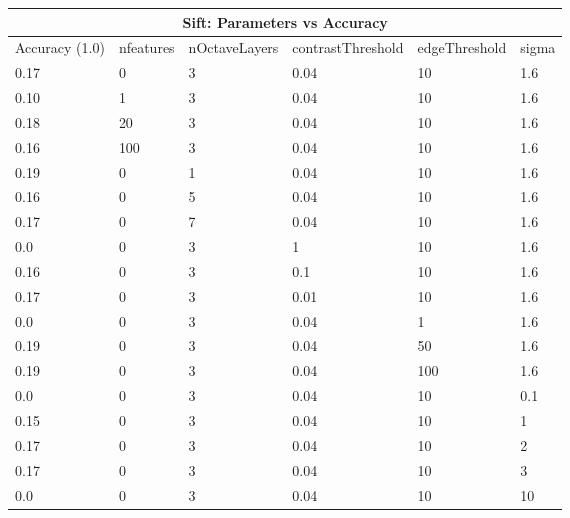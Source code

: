 \documentclass[12pt]{article}
\begin{document}
    \vspace*{0.5cm}
        \begin{tabular}{ |p{1.5cm}||p{3cm}|p{3cm}|p{3cm}|p{3cm}|p{2cm}|  }
            \hline
            \multicolumn{6}{|c|}{Sift: Parameters vs Accuracy} \\
            \hline
            Accuracy (1.0) & nfeatures & nOctaveLayers & contrastThreshold & edgeThreshold & sigma \\
            \hline
            0.17 & 0 & 3 & 0.04 & 10 & 1.6 \\
            \hline
            \hline
            0.10 & 1 & 3 & 0.04 & 10 & 1.6 \\
            0.18 & 20 & 3 & 0.04 & 10 & 1.6 \\
            0.16 & 100 & 3 & 0.04 & 10 & 1.6 \\
            \hline
            \hline
            0.19 & 0 & 1 & 0.04 & 10 & 1.6 \\
            0.16 & 0 & 5 & 0.04 & 10 & 1.6 \\
            0.17 & 0 & 7 & 0.04 & 10 & 1.6 \\
            \hline
            \hline
            0.0 & 0 & 3 & 1 & 10 & 1.6 \\
            0.16 & 0 & 3 & 0.1 & 10 & 1.6 \\
            0.17 & 0 & 3 & 0.01 & 10 & 1.6 \\
            \hline
            \hline
            0.0 & 0 & 3 & 0.04 & 1 & 1.6 \\
            0.19 & 0 & 3 & 0.04 & 50 & 1.6 \\
            0.19 & 0 & 3 & 0.04 & 100 & 1.6 \\
            \hline
            \hline
            0.0 & 0 & 3 & 0.04 & 10 & 0.1 \\
            0.15 & 0 & 3 & 0.04 & 10 & 1 \\
            0.17 & 0 & 3 & 0.04 & 10 & 2 \\
            0.17 & 0 & 3 & 0.04 & 10 & 3 \\
            0.0 & 0 & 3 & 0.04 & 10 & 10 \\
            \hline


            \hline
        \end{tabular}

        
\end{document}

